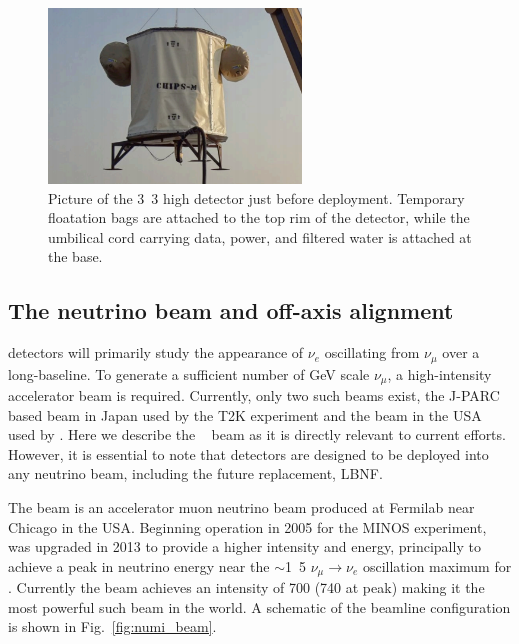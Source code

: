 \begin{figure} %
    \includegraphics[width=0.6\textwidth]{diagrams/4-chips/chips_m.png}
    \caption[Picture of the \chipsm detector]
    {Picture of the \unit{3.3}{} high \chipsm detector just before deployment. Temporary
        floatation bags are attached to the top rim of the detector, while the umbilical cord
        carrying data, power, and filtered water is attached at the base.}
    \label{fig:chips_m}
\end{figure}

\subsection{The neutrino beam and off-axis alignment} %
\label{sec:chips_concept_beam} %

\chips detectors will primarily study the appearance of $\nu_{e}$ oscillating from $\nu_{\mu}$
over a long-baseline. To generate a sufficient number of GeV scale $\nu_{\mu}$, a high-intensity
accelerator beam is required. Currently, only two such beams exist, the J-PARC based beam in Japan
used by the T2K experiment and the \numi beam in the USA used by \nova. Here we describe the
\numi~\cite{adamson2016} beam as it is directly relevant to current \chips efforts. However, it is
essential to note that \chips detectors are designed to be deployed into any neutrino beam,
including the future \numi replacement, LBNF.

The \numi beam is an accelerator muon neutrino beam produced at Fermilab near Chicago in the USA.
Beginning operation in 2005 for the MINOS experiment, \numi was upgraded in 2013 to provide a
higher intensity and energy, principally to achieve a peak in neutrino energy near the
$\sim$\unit{1.5}{\GeV} $\nu_{\mu}\rightarrow\nu_{e}$ oscillation maximum for \nova. Currently the
\numi beam achieves an intensity of \unit{700}{} (\unit{740}{} at peak)
making it the most powerful such beam in the world. A schematic of the \numi beamline
configuration is shown in Fig.~\ref{fig:numi_beam}.

